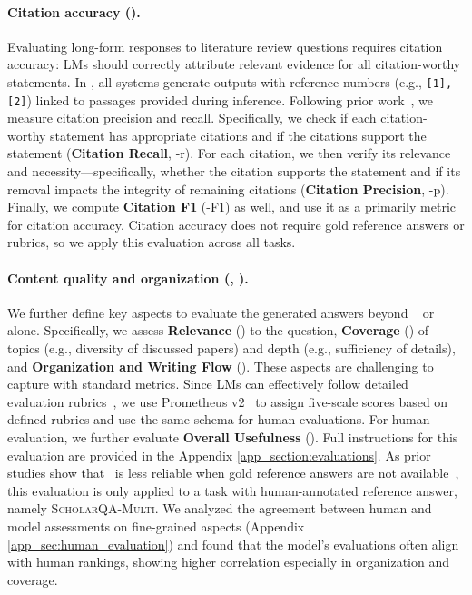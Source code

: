 \paragraph{Citation accuracy (\cit).}
Evaluating long-form responses to literature review questions requires citation accuracy: LMs should correctly attribute relevant evidence for all citation-worthy statements. In \data, all systems generate outputs with reference numbers (e.g., \texttt{[1], [2]}) linked to passages provided during inference. Following prior work~\citep{gao2023enabling,liu2023evaluating}, we measure citation precision and recall. Specifically, we check if each citation-worthy statement has appropriate citations and if the citations support the statement ({\bf Citation Recall}, \cit-r). 
For each citation, we then verify its relevance and necessity---specifically, whether the citation supports the statement and if its removal impacts the integrity of remaining citations ({\bf Citation Precision}, \cit-p). 
Finally, we compute {\bf Citation F1} (\cit-F1) as well, and use it as a primarily metric for citation accuracy. 
Citation accuracy does not require gold reference answers or rubrics, so we apply this evaluation across all tasks. 

\paragraph{Content quality and organization (\llm, \expert).}
We further define key aspects to evaluate the generated answers beyond \acc~ or \cit~ alone. Specifically, we assess {\bf Relevance} (\rel) to the question, {\bf Coverage} (\cov) of topics (e.g., diversity of discussed papers) and depth (e.g., sufficiency of details), and {\bf Organization and Writing Flow} (\org). These aspects are challenging to capture with standard metrics.  
 Since LMs can effectively follow detailed evaluation rubrics~\citep{zheng2023judging,kim2024prometheus}, we use Prometheus v2~\citep{kim2024prometheus} to assign five-scale scores based on defined rubrics and use the same schema for human evaluations. For human evaluation, we further evaluate {\bf Overall Usefulness}  (\useh).  
Full instructions for this evaluation are provided in the Appendix \ref{app_section:evaluations}. 
As prior studies show that \llm~is less reliable when gold reference answers are not available~\citep{kim2024biggen}, this evaluation is only applied to a task with human-annotated reference answer, namely \textsc{ScholarQA-Multi}. 
We analyzed the agreement between human and model assessments on fine-grained aspects (Appendix \ref{app_sec:human_evaluation}) and found that the model's evaluations often align with human rankings, showing higher correlation especially in organization and coverage. 
